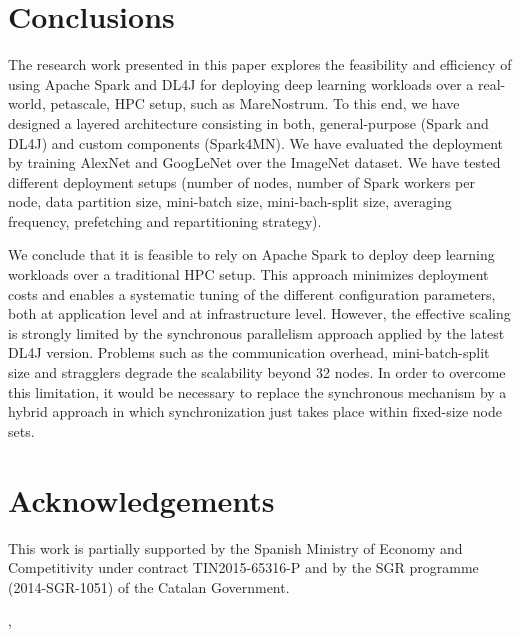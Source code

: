 \documentclass[journal]{IEEEtran}
\begin{document}
\section{Conclusions}
The research work presented in this paper explores the feasibility and efficiency of using Apache Spark and DL4J for 
deploying deep learning workloads over a real-world, petascale, HPC setup, such as MareNostrum.
To this end, we have designed a layered architecture consisting in both, general-purpose (Spark and DL4J) and custom components (Spark4MN). 
We have evaluated the deployment by training AlexNet and GoogLeNet over the ImageNet dataset. We have tested different deployment setups (number of nodes, number of Spark workers per node, data partition size, mini-batch size, mini-bach-split size, averaging frequency, prefetching and repartitioning strategy).  

We conclude that it is feasible to rely on Apache Spark to deploy deep learning workloads over a traditional HPC setup. This approach minimizes deployment costs and enables a systematic tuning of the different configuration parameters, both at application level and at infrastructure level. However, the effective scaling is strongly limited by the synchronous parallelism approach applied by the latest DL4J version. Problems such as the communication overhead, mini-batch-split size and stragglers degrade the scalability beyond 32 nodes. In order to overcome this limitation, it would be necessary to replace the synchronous mechanism by a hybrid approach in which synchronization just takes place within fixed-size node sets.


\section*{Acknowledgements}
This work is partially supported by the Spanish Ministry of Economy and Competitivity under contract TIN2015-65316-P and by the SGR programme (2014-SGR-1051) of the Catalan Government.

\begin{small}
,

\end{small}


\end{document}
